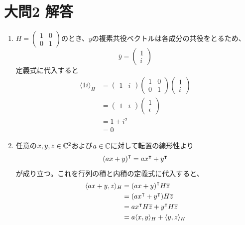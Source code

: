\documentclass[dvipdfmx]{jsreport}
\begin{document}
\section{大問2 解答}
\begin{souanswer} %
\begin{enumerate}
	\item $H= \begin{pmatrix}1& 0\\ 0& 1\end{pmatrix}$のとき、$y$の複素共役ベクトルは各成分の共役をとるため、
\begin{equation*}
    \bar{y}= \begin{pmatrix}1\\ i\end{pmatrix}
\end{equation*}
    定義式に代入すると
\begin{align*}
    \langle{1 i}\rangle_H
    &= \begin{pmatrix}1& i\end{pmatrix}\begin{pmatrix}1& 0\\ 0& 1\end{pmatrix}\begin{pmatrix}1\\ i\end{pmatrix}\\
    &= \begin{pmatrix}1& i\end{pmatrix}\begin{pmatrix}1\\ i\end{pmatrix}\\
    &= 1+ i^2\\
    &= 0
\end{align*}
    \item 任意の$x, y, z\in \mathbb{C}^2$および$a\in \mathbb{C}$に対して転置の線形性より
\begin{equation*}
    {(ax+ y)}^\intercal= a{x}^\intercal+ {y}^\intercal
\end{equation*}
    が成り立つ。これを行列の積と内積の定義式に代入すると、
\begin{align*}
    \langle{ax+ y, z}\rangle_H
    &= {(ax+ y)}^\intercal H\overline{z}\\
    &= (a{x}^\intercal+ {y}^\intercal)H\overline{z}\\
    &= a{x}^\intercal H\overline{z}+ {y}^\intercal H\overline{z}\\
    &= a\langle{x, y}\rangle_H+ \langle{y, z}\rangle_H
\end{align*}

\end{enumerate}
\end{souanswer}
\end{document}
